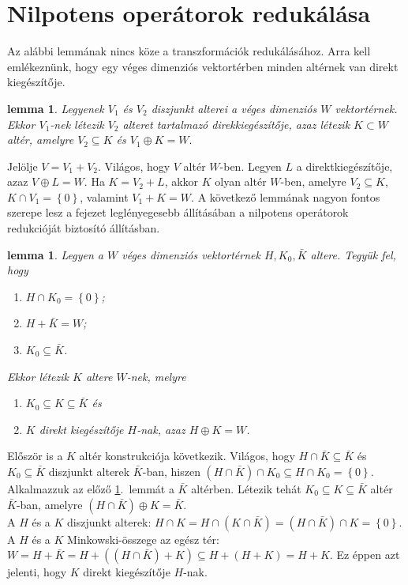 \documentclass[9pt, a4paper, showtrims]{memoir}
\makeatletter
\renewenvironment{proof}[1][\proofname]
    {\par\pushQED{\qed}%
    \normalfont \topsep6\p@\@plus6\p@\relax
    \trivlist
    \item[\hskip\labelsep
        \itshape
    #1\@addpunct{:}]\ignorespaces}
    {\popQED\endtrivlist\@endpefalse}
\theoremstyle{plain}
\newtheorem{lemma}[proposition]{lemma}
\theoremstyle{remark}
\theoremstyle{definition}
\makeatother
\begin{document}
\section{Nilpotens operátorok redukálása}
Az alábbi lemmának nincs köze a transzformációk redukálásához.
Arra kell emlékeznünk, hogy egy véges dimenziós vektortérben minden altérnek van direkt kiegészítője.
\begin{lemma}
	Legyenek $V_1$ és $V_2$ diszjunkt alterei a véges dimenziós $W$ vektortérnek.
	Ekkor $V_1$-nek létezik $V_2$ alteret tartalmazó direkkiegészítője,
	azaz
	létezik $K\subset W$ altér, amelyre $V_2\subseteq K$ és $V_1\oplus K=W.$
	\label{felb0}
\end{lemma}
\begin{proof}
	Jelölje $V=V_1+V_2$.
	Világos, hogy $V$ altér $W$-ben.
	Legyen $L$ a direktkiegészítője, azaz $V\oplus L=W$.
	Ha $K=V_2+L$, akkor $K$ olyan altér $W$-ben,
	amelyre $V_2\subseteq K$, $K\cap V_1=\left\{ 0 \right\}$, valamint
	$V_1+K=W$.
\end{proof}
A következő lemmának nagyon fontos szerepe lesz a fejezet leglényegesebb állításában
a nilpotens operátorok redukcióját biztosító állításban.
\begin{lemma}\label{lem:felb}
	Legyen a $W$ véges dimenziós vektortérnek $H,K_0,\bar{K}$ altere.
	Tegyük fel, hogy
	\begin{enumerate}\firmlist
		\item $H\cap K_0=\left\{ 0 \right\}$;
		\item $H+\bar{K}=W$;
		\item $K_0\subseteq\bar{K}$.
	\end{enumerate}
	Ekkor létezik $K$ altere $W$-nek, melyre
	\begin{enumerate}\firmlist
		\item $K_0\subseteq K\subseteq\bar{K}$ és
		\item $K$ direkt kiegészítője $H$-nak, azaz
		      $H\oplus K=W$.\qedhere
	\end{enumerate}
\end{lemma}
\begin{proof}
	Először is a $K$ altér konstrukciója következik.
	Világos, hogy $H\cap\bar{K}\subseteq\bar{K}$ és $K_0\subseteq\bar{K}$ diszjunkt alterek
	$\bar{K}$-ban, hiszen
	\(
	\left( H\cap\bar{K} \right)\cap K_0\subseteq
	H\cap K_0=\left\{ 0 \right\}.
	\)
	Alkalmazzuk az előző \ref{felb0}.~lemmát a $\bar{K}$ altérben.
	Létezik tehát $K_0\subseteq K\subseteq \bar{K}$ altér $\bar{K}$-ban,
	amelyre
	\(
	\left( H\cap\bar{K} \right)\oplus K=\bar{K}.
	\)
	\\
	A $H$ és a $K$ diszjunkt alterek:
	\(
	H\cap K=H\cap\left( K\cap \bar{K} \right)=\left( H\cap\bar{K} \right)\cap K=\left\{ 0 \right\}.
	\)
	\\
	A $H$ és a $K$ Minkowski-összege az egész tér:
	\(
	W=H+\bar{K}
	=
	H+\left( (H\cap\bar{K})+K \right)
	\subseteq
	H+(H+K)
	=
	H+K.
	\)
	Ez éppen azt jelenti, hogy $K$ direkt kiegészítője $H$-nak.
\end{proof}
\end{document}
